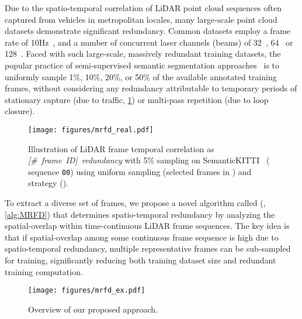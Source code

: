\documentclass[10pt,twocolumn,letterpaper]{article}
\begin{document}
\noindent
Due to the spatio-temporal correlation of LiDAR point cloud sequences often captured from vehicles in metropolitan locales, many large-scale point cloud datasets demonstrate significant redundancy. Common datasets employ a frame rate of 10Hz~\cite{Geiger2012,nuscenes2019,behley2019semantickittia,lyft2019,Bijelic2020,sun2020scalability,li2021durlara}, and a number of concurrent laser channels (beams) of 32~\cite{nuscenes2019}, 64~\cite{Geiger2012,behley2019semantickittia,lyft2019,Bijelic2020,sun2020scalability} or 128~\cite{li2021durlara}. Faced with such large-scale, massively redundant training datasets, the popular practice of semi-supervised semantic segmentation approaches~\cite{tarvainen2017mean,french2020semisupervised,zou2018unsupervised,chen2021semisupervised,kong2022lasermix} is to uniformly sample 1\%, 10\%, 20\%, or 50\% of the available annotated training frames, without considering any redundancy attributable to temporary periods of stationary capture (\eg due to traffic, \cref{fig:mrfd_real}) or multi-pass repetition (\eg due to loop closure). 


\begin{figure}[htp]
    \hspace*{-12pt}
    \centering
    \texttt{[image: figures/mrfd\_real.pdf]}
    \caption{Illustration of LiDAR frame temporal correlation as \textit{[\#~frame~ID]~redundancy} with 5\% sampling on SemanticKITTI~\cite{behley2019semantickittia} ( sequence \texttt{00}) using uniform sampling (selected frames in \textcolor{fg5_blue}{\FilledSmallCircle}) and {\samplshort} strategy (\textcolor{fg5_red}{\FilledSmallCircle}).}
    \label{fig:mrfd_real}
    \vspace{-10pt}
\end{figure}

To extract a diverse set of frames, we propose a novel algorithm called {\samplfull} ({\samplshort}, \cref{alg:MRFD}) that determines spatio-temporal redundancy by analyzing the spatial-overlap within time-continuous LiDAR frame sequences. The key idea is that if spatial-overlap among some continuous frame sequence is high due to spatio-temporal redundancy, multiple representative frames can be sub-sampled for training, significantly reducing both training dataset size and redundant training computation. 

\begin{figure*}[htp]
    \centering
    \texttt{[image: figures/mrfd\_ex.pdf]}
    \caption{Overview of our proposed {\samplfull} approach.}
    \label{fig:mrfd_ex}
    \vspace{-8pt}
\end{figure*}
\end{document}

